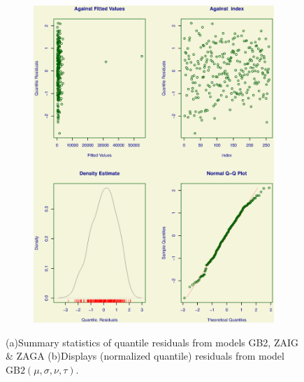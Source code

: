 \documentclass{DissertateUSU}
\begin{document}
\begin{figure}
\begin{subfigure}[b]{0.5\textwidth}
   \includegraphics[width=1\linewidth]{ROC_4Plot_GB2.eps}
   \caption{}
   \label{Residuals_GB2}
\end{subfigure}

\caption[Normalized quantile residuals from model GB2]{(a)Summary statistics of quantile residuals from models GB2, ZAIG \& ZAGA (b)Displays (normalized quantile) residuals from model $\mbox{GB}2(\mu,\sigma,\nu,\tau)$.}
\end{figure}
\end{document}
